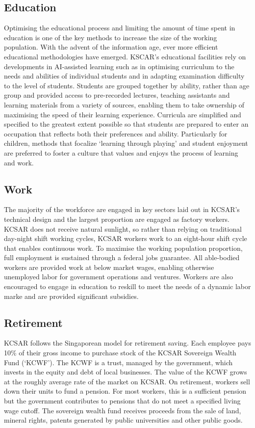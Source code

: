 \documentclass[fleqn,10pt]{Stylesheet} %
\begin{document}
\subsection{Education}
Optimising the educational process and limiting the amount of time spent in education is one of the key methods to increase the size of the working population. With the advent of the information age, ever more efficient educational methodologies have emerged. KSCAR's educational facilities rely on developments in AI-assisted learning such as in optimising curriculum to the needs and abilities of individual students and in adapting examination difficulty to the level of students. Students are grouped together by ability, rather than age group and provided access to pre-recorded lectures, teaching assistants and learning materials from a variety of sources, enabling them to take ownership of maximising the speed of their learning experience. Curricula are simplified and specified to the greatest extent possible so that students are prepared to enter an occupation that reflects both their preferences and ability. Particularly for children, methods that focalize ‘learning through playing’ and student enjoyment are preferred to foster a culture that values and enjoys the process of learning and work.

\subsection{Work}
The majority of the workforce are engaged in key sectors laid out in KCSAR's technical design and the largest proportion are engaged as factory workers. KCSAR does not receive natural sunlight, so rather than relying on traditional day-night shift working cycles, KCSAR workers work to an eight-hour shift cycle that enables continuous work. To maximise the working population proportion, full employment is sustained through a federal jobs guarantee. All able-bodied workers are provided work at below market wages, enabling otherwise unemployed labor for government operations and ventures. Workers are also encouraged to engage in education to reskill to meet the needs of a dynamic labor marke and are provided significant subsidies.   

\subsection{Retirement}
KCSAR follows the Singaporean model for retirement saving. Each employee pays 10\% of their gross income to purchase stock of the KCSAR Sovereign Wealth Fund (‘KCWF’). The KCWF is a trust, managed by the government, which invests in the equity and debt of local businesses. The value of the KCWF grows at the roughly average rate of the market on KCSAR. On retirement, workers sell down their units to fund a pension. For most workers, this is a sufficient pension but the government contributes to pensions that do not meet a specified living wage cutoff. The sovereign wealth fund receives proceeds from the sale of land, mineral rights, patents generated by public universities and other public goods.
\end{document}
